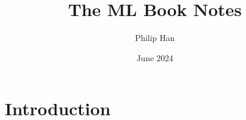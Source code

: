 \documentclass{article}
\title{The ML Book Notes}
\author{Philip Han}
\date{June 2024}
\begin{document}
\maketitle

\section{Introduction}
\end{document}
